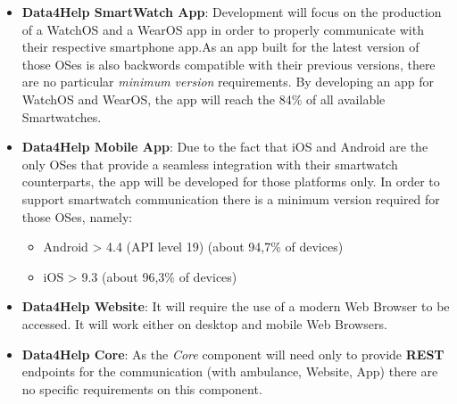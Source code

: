 \begin{itemize}
    \item \textbf{Data4Help SmartWatch App}: Development will focus on the production of a WatchOS and a WearOS app in order to properly communicate with their respective smartphone app.\newline As an app built for the latest version of those OSes is also backwords compatible with their previous versions, there are no particular \textit{minimum version} requirements.
    By developing an app for WatchOS and WearOS, the app will reach the 84\% of all available Smartwatches.
    
    
    \item \textbf{Data4Help Mobile App}: Due to the fact that iOS and Android are the only OSes that provide a seamless integration with their smartwatch counterparts, the app will be developed for those platforms only.
    In order to support smartwatch communication there is a minimum version required for those OSes, namely:
    \begin{itemize}
        \item Android \textgreater \vspace{0.1cm} 4.4 (API level 19) (about 94,7\% of devices)
        \item iOS \textgreater \vspace{0.4cm} 9.3 (about 96,3\% of devices)
    \end{itemize}
    
    \item \textbf{Data4Help Website}: It will require the use of a modern Web Browser to be accessed. It will work either on desktop and mobile Web Browsers.
    
    \item \textbf{Data4Help Core}: As the \textit{Core} component will need only to provide \textbf{REST} endpoints for the communication (with ambulance, Website, App) there are no specific requirements on this component.
\end{itemize}

